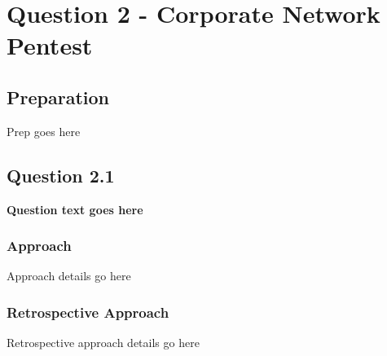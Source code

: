 \chapter{Question 2 - Corporate Network Pentest}

\section{Preparation}
Prep goes here

\section{Question 2.1}
\textbf{Question text goes here}
\subsection{Approach}
Approach details go here
\subsection{Retrospective Approach}
Retrospective approach details go here
